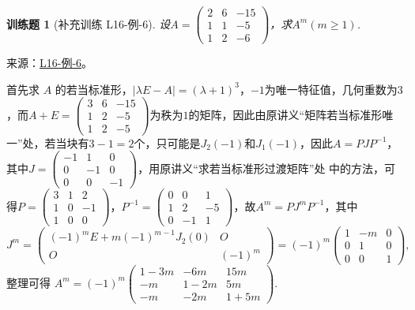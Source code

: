 \documentclass[UTF8,12pt,a4paper,fontset=fandol]{ctexart}
\newtheorem{exercise}{训练题}[section]
\begin{document}
\begin{exercise}[补充训练 L16-例-6]\label{prob:L16-例-6}
设$A=\begin{pmatrix}
            2 & 6 & -15 \\ 1 & 1 & -5 \\ 1 & 2 & -6
        \end{pmatrix}$，求$A^{m}(m\geqslant 1)$.
\end{exercise}
\noindent 来源：\href{https://github.com/yhwu-is/Linear-Algebra-Left-Undone/blob/new/%E8%AE%B2%E4%B9%89/%E4%B8%93%E9%A2%98/16%20%E8%8B%A5%E5%BD%93%E6%A0%87%E5%87%86%E5%BD%A2.tex}{L16-例-6}。
\begin{solve}
首先求 $A$ 的若当标准形，$|\lambda E - A|=(\lambda + 1)^3$，$-1$为唯一特征值，几何重数为$3$，而$A+E=\begin{pmatrix}
            3 & 6 & -15 \\ 1 & 2 & -5 \\ 1 & 2 & -5
        \end{pmatrix}$为秩为$1$的矩阵，因此由原讲义“矩阵若当标准形唯一”处，若当块有$3-1=2$个，只可能是$J_2(-1)$和$J_1(-1)$，因此$A=PJP^{-1}$，其中$J=\begin{pmatrix}
            -1 & 1 & 0 \\ 0 & -1 & 0 \\ 0 & 0 & -1
        \end{pmatrix}$，用原讲义“求若当标准形过渡矩阵”处 中的方法，可得$P=\begin{pmatrix}
            3 & 1 & 2 \\ 1 & 0 & -1 \\ 1 & 0 & 0
        \end{pmatrix}$，$P^{-1}=\begin{pmatrix}
            0 & 0 & 1 \\ 1 & 2 & -5 \\ 0 & -1 & 1
        \end{pmatrix}$，故$A^m=PJ^mP^{-1}$，其中
        \[
            J^m=\begin{pmatrix}
                (-1)^m E + m(-1)^{m-1}J_2(0) & O \\ O & (-1)^m
            \end{pmatrix}=(-1)^m\begin{pmatrix}
                1 & -m & 0 \\ 0 & 1 & 0 \\ 0 & 0 & 1
            \end{pmatrix},
        \]
        整理可得 $A^m=(-1)^m\begin{pmatrix}
            1-3m & -6m & 15m \\ -m & 1-2m & 5m \\ -m & -2m & 1+5m
        \end{pmatrix}$.
\end{solve}
\end{document}
